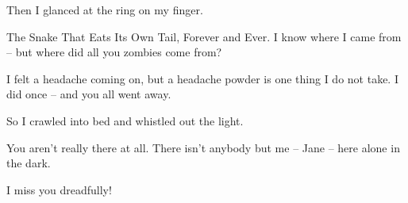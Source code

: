 Then I glanced at the ring on my finger.

The Snake That Eats Its Own Tail, Forever and  Ever.  I
know  where  I  came  from -- but where did all you zombies come
from?

I felt a headache coming on, but a headache  powder  is
one thing I do not take. I did once -- and you all went away.

So I crawled into bed and whistled out the light.

You aren't really there at all. There isn't anybody but
me -- Jane -- here alone in the dark.

I miss you dreadfully!
